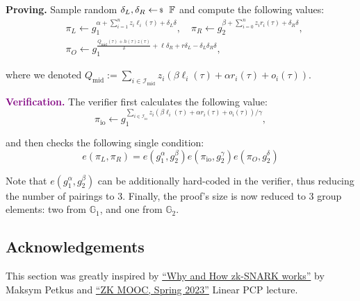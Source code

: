 \documentclass[../../book.tex]{subfiles}
\begin{document}
\textcolor{green!50!black}{\textbf{Proving.}} Sample random $\delta_L,\delta_R \leftarrowS \mathbb{F}$ and compute the following values:
\begin{equation*}    
    \begin{aligned}
        &\pi_L \gets g_1^{\alpha + \sum_{i=1}^n z_i\ell_i(\tau) + \delta_L\delta}, \quad \pi_R \gets g_2^{\beta + \sum_{i=0}^n z_ir_i(\tau) + \delta_R\delta}, \\
        &\pi_O \gets g_1^{\frac{Q_{\text{mid}}(\tau)+h(\tau)z(\tau)}{\delta} + \ell\delta_R + r\delta_L - \delta_L\delta_R\delta},
    \end{aligned}
\end{equation*}

where we denoted $Q_{\text{mid}} := \sum_{i \in \mathcal{I}_{\text{mid}}}z_i(\beta \ell_i(\tau) + \alpha r_i(\tau) + o_i(\tau))$.

\textcolor{purple}{\textbf{Verification.}} The verifier first calculates the following value:
\begin{equation*}
    \pi_{\text{io}} \gets g_1^{\sum_{i \in \mathcal{I}_{\text{io}}}z_i(\beta \ell_i(\tau) + \alpha r_i(\tau) + o_i(\tau))/\gamma},
\end{equation*}

and then checks the following single condition:
\begin{equation*}
    e(\pi_L, \pi_R) = e(g_1^{\alpha}, g_2^{\beta})e(\pi_{\text{io}},g_2^{\gamma})e(\pi_O,g_2^{\delta})
\end{equation*}

Note that $e(g_1^{\alpha}, g_2^{\beta})$ can be additionally hard-coded in the verifier, thus reducing the number of pairings to 3. Finally, the proof's size is now reduced to 3 group elements: two from $\mathbb{G}_1$, and one from $\mathbb{G}_2$.

\subsection*{Acknowledgements}

This section was greatly inspired by \cite{petkus2019}
\href{https://arxiv.org/abs/1906.07221}{``Why and How zk-SNARK works''} by
Maksym Petkus and \href{https://rdi.berkeley.edu/zk-learning/}{``ZK MOOC, Spring
2023''} Linear PCP lecture.
\end{document}
